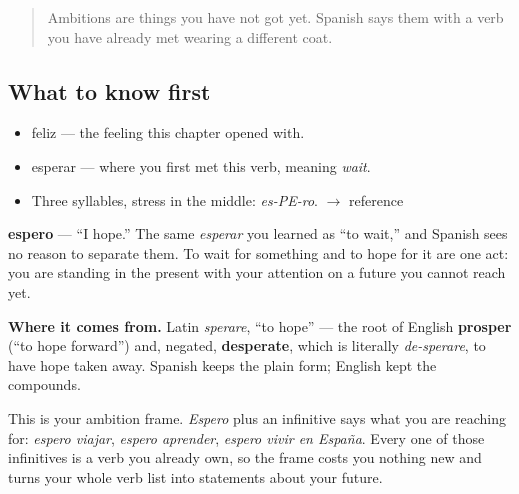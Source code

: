 \label{lesson:ES-C269-espero}



\begin{quote}
Ambitions are things you have not got yet. Spanish says them with a verb you have already met wearing a different coat.
\end{quote}

\subsection*{What to know first}
\begin{itemize}
\raggedright
  \item feliz — the feeling this chapter opened with.
  \item esperar — where you first met this verb, meaning \emph{wait}.
\end{itemize}

\begin{sounds}
\begin{itemize}
\raggedright
  \item Three syllables, stress in the middle: \emph{es-PE-ro}. $\to$ reference
\end{itemize}
\end{sounds}

\begin{cousinweb}
\textbf{espero} — \textquotedblleft{}I hope.\textquotedblright{} The same \emph{esperar} you learned as \textquotedblleft{}to wait,\textquotedblright{} and Spanish sees no reason to separate them. To wait for something and to hope for it are one act: you are standing in the present with your attention on a future you cannot reach yet.

\textbf{Where it comes from.} Latin \emph{sperare}, \textquotedblleft{}to hope\textquotedblright{} — the root of English \textbf{prosper} (\textquotedblleft{}to hope forward\textquotedblright{}) and, negated, \textbf{desperate}, which is literally \emph{de-sperare}, to have hope taken away. Spanish keeps the plain form; English kept the compounds.
\end{cousinweb}

\begin{grammarlens}[title={What you've built}]
This is your ambition frame. \emph{Espero} plus an infinitive says what you are reaching for: \emph{espero viajar}, \emph{espero aprender}, \emph{espero vivir en España}. Every one of those infinitives is a verb you already own, so the frame costs you nothing new and turns your whole verb list into statements about your future.
\end{grammarlens}


